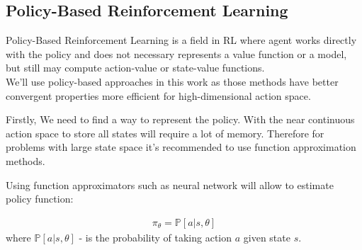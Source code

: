 










\subsection{Policy-Based Reinforcement Learning}
\label{ss:pol_based_rl}
Policy-Based Reinforcement Learning is a field in RL where agent works directly
with the policy and does not necessary represents a value function or a model,
but still may compute action-value or state-value functions.\\
We'll use policy-based approaches in this work as those methods have better
convergent properties more efficient for high-dimensional action space.
\cite{DBLP:journals/corr/MnihHGK14}


Firstly, We need to find a way to represent the policy. With the near continuous
action space to store
all states will require a lot of memory. Therefore for problems with large
state space it's recommended to use function approximation methods.

Using function approximators such as neural network will allow to
estimate policy function:

\begin{align} \label{eq:policy_appr_func}
	\pi_{\theta} = \mathbb{P}[a|s, \theta]
\end{align}
where $\mathbb{P}[a|s, \theta]$ - is the probability of taking action $a$
given state $s$.

